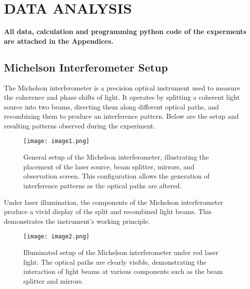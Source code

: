 \documentclass[a4paper,11pt]{article}
\begin{document}
\newpage
\section{\centering DATA ANALYSIS}
\label{sec:DATA ANALYSIS}
\textbf{All data, calculation and programming python code of the experments are attached in the Appendices.}\\

\subsection{Michelson Interferometer Setup}

The Michelson interferometer is a precision optical instrument used to measure the coherence and phase shifts of light. It operates by splitting a coherent light source into two beams, directing them along different optical paths, and recombining them to produce an interference pattern. Below are the setup and resulting patterns observed during the experiment.\\

\begin{figure}[H]
    \centering
    \texttt{[image: image1.png]} %
    \caption{General setup of the Michelson interferometer, illustrating the placement of the laser source, beam splitter, mirrors, and observation screen. This configuration allows the generation of interference patterns as the optical paths are altered.}
    \label{fig:setup}
\end{figure}

Under laser illumination, the components of the Michelson interferometer produce a vivid display of the split and recombined light beams. This demonstrates the instrument's working principle.\\

\begin{figure}[H]
    \centering
    \texttt{[image: image2.png]} %
    \caption{Illuminated setup of the Michelson interferometer under red laser light. The optical paths are clearly visible, demonstrating the interaction of light beams at various components such as the beam splitter and mirrors.}
    \label{fig:illuminated_setup}
\end{figure}
\end{document}
